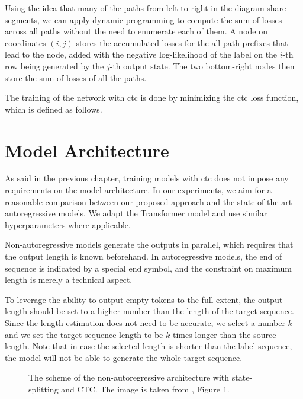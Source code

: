 Using the idea that many of the paths from left to right in the diagram share
segments, we can apply dynamic programming to compute the sum of losses across
all paths without the need to enumerate each of them. A node on coordinates
$(i,j)$ stores the accumulated losses for the all path prefixes that lead to
the node, added with the negative log-likelihood of the label on the $i$-th row
being generated by the $j$-th output state. The two bottom-right nodes then
store the sum of losses of all the paths.


 The training of the network with \ac{ctc} is done by minimizing
the \ac{ctc} loss function, which is defined as follows.

\section{Model Architecture}
\label{sec:ctc:arch}

As said in the previous chapter, training models with \ac{ctc} does not impose
any requirements on the model architecture. In our experiments, we aim for a
reasonable comparison between our proposed approach and the state-of-the-art
autoregressive models. We adapt the Transformer model and use similar
hyperparameters where applicable.

Non-autoregressive models generate the outputs in parallel, which requires that
the output length is known beforehand. In autoregressive models, the end of
sequence is indicated by a special end symbol, and the constraint on maximum
length is merely a technical aspect.

To leverage the ability to output empty tokens to the full extent, the output
length should be set to a higher number than the length of the target sequence.
Since the length estimation does not need to be accurate, we select a number
$k$ and we set the target sequence length to be $k$ times longer than the
source length. Note that in case the selected length is shorter than the label
sequence, the model will not be able to generate the whole target sequence.

\begin{figure}
  \centering
  

  \caption{The scheme of the non-autoregressive architecture with
    state-splitting and CTC. The image is taken from
    \citet{libovicky-helcl-2018-end}, Figure 1.}%
  \label{fig:state-splitting}
\end{figure}


